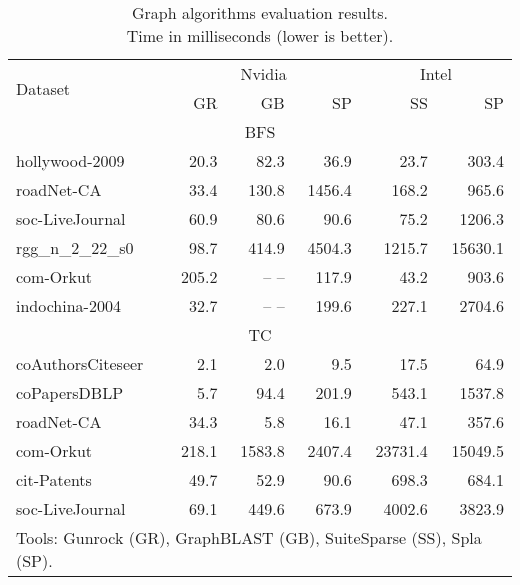 \begin{table}[tbp]
\caption{Graph algorithms evaluation results.\\Time in milliseconds (lower is better).} 
\begin{center}
    \begin{tabular}{|l|r|r|r|r|r|}
    \hline
    \multirow{2}{*}{Dataset} & \multicolumn{3}{c|}{Nvidia} & \multicolumn{2}{c|}{Intel} \\
    \cline{2-6}
    & GR & GB & SP & SS & SP \\
    \hline
    \hline
    \multicolumn{6}{|c|}{BFS} \\
    \hline
    \rowcolor{black!10} hollywood-2009    &  20.3 &  82.3 &   36.9 &   23.7 &   303.4 \\
    \rowcolor{black!2 } roadNet-CA        &  33.4 & 130.8 & 1456.4 &  168.2 &   965.6 \\
    \rowcolor{black!10} soc-LiveJournal   &  60.9 &  80.6 &   90.6 &   75.2 &  1206.3 \\
    \rowcolor{black!2 } rgg\_n\_2\_22\_s0 &  98.7 & 414.9 & 4504.3 & 1215.7 & 15630.1 \\
    \rowcolor{black!10} com-Orkut         & 205.2 & -- -- &  117.9 &   43.2 &   903.6 \\
    \rowcolor{black!2 } indochina-2004    &  32.7 & -- -- &  199.6 &  227.1 &  2704.6 \\
    \hline
    \hline
    \multicolumn{6}{|c|}{TC} \\
    \hline
    \rowcolor{black!10} coAuthorsCiteseer &   2.1 &    2.0 &    9.5 &    17.5 &    64.9 \\
    \rowcolor{black!2 } coPapersDBLP      &   5.7 &   94.4 &  201.9 &   543.1 &  1537.8 \\
    \rowcolor{black!10} roadNet-CA        &  34.3 &    5.8 &   16.1 &    47.1 &   357.6 \\
    \rowcolor{black!2 } com-Orkut         & 218.1 & 1583.8 & 2407.4 & 23731.4 & 15049.5 \\
    \rowcolor{black!10} cit-Patents       &  49.7 &   52.9 &   90.6 &   698.3 &   684.1 \\
    \rowcolor{black!2 } soc-LiveJournal   &  69.1 &  449.6 &  673.9 &  4002.6 &  3823.9 \\
    \hline
    \hline
    \multicolumn{6}{l}{Tools: Gunrock (GR), GraphBLAST (GB), SuiteSparse (SS), Spla (SP).} \\
    \end{tabular}
    \label{results}
\end{center}
\end{table}
 
